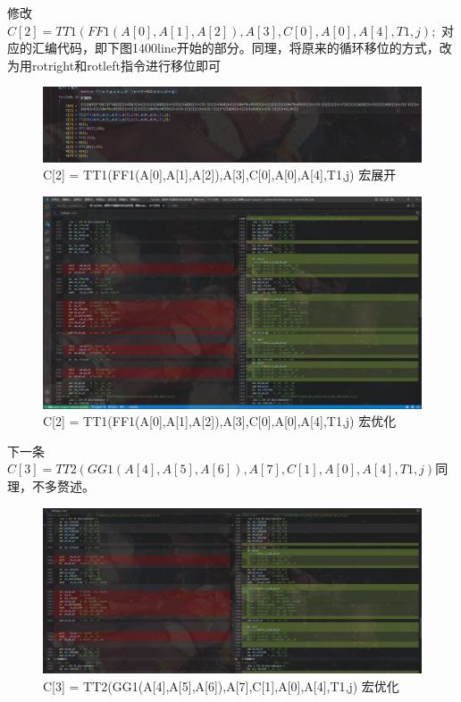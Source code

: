 \documentclass[12pt,hyperref,a4paper,UTF8]{ctexart}
\begin{document}
    修改$C[2] = TT1(FF1(A[0],A[1],A[2]),A[3],C[0],A[0],A[4],T1,j);$
对应的汇编代码，即下图1400line开始的部分。同理，将原来的循环移位的方式，改为用rotright和rotleft指令进行移位即可


    \begin{figure}[H]
      \centering
      \includegraphics[width =1.0\textwidth]{figures/fig/image16.png}
      \caption{C[2] = TT1(FF1(A[0],A[1],A[2]),A[3],C[0],A[0],A[4],T1,j) 宏展开}
  \end{figure}

  \begin{figure}[H]
      \centering
      \includegraphics[width =1.0\textwidth]{figures/fig/image15.png}
      \caption{C[2] = TT1(FF1(A[0],A[1],A[2]),A[3],C[0],A[0],A[4],T1,j) 宏优化}
  \end{figure}

    下一条$C[3] = TT2(GG1(A[4],A[5],A[6]),A[7],C[1],A[0],A[4],T1,j)$同理，不多赘述。

  \begin{figure}[H]
      \centering
      \includegraphics[width =1.0\textwidth]{figures/fig/image17.png}
      \caption{C[3] = TT2(GG1(A[4],A[5],A[6]),A[7],C[1],A[0],A[4],T1,j) 宏优化}
  \end{figure}
\end{document}
